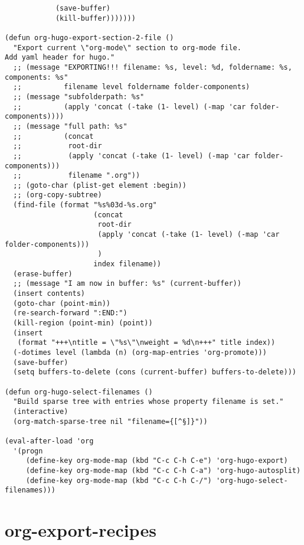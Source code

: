 \documentclass[11pt]{article}
\begin{document}
\begin{verbatim}
            (save-buffer)
            (kill-buffer)))))))

(defun org-hugo-export-section-2-file ()
  "Export current \"org-mode\" section to org-mode file.
Add yaml header for hugo."
  ;; (message "EXPORTING!!! filename: %s, level: %d, foldername: %s, components: %s"
  ;;          filename level foldername folder-components)
  ;; (message "subfolderpath: %s"
  ;;          (apply 'concat (-take (1- level) (-map 'car folder-components))))
  ;; (message "full path: %s"
  ;;          (concat
  ;;           root-dir
  ;;           (apply 'concat (-take (1- level) (-map 'car folder-components)))
  ;;           filename ".org"))
  ;; (goto-char (plist-get element :begin))
  ;; (org-copy-subtree)
  (find-file (format "%s%03d-%s.org"
                     (concat
                      root-dir
                      (apply 'concat (-take (1- level) (-map 'car folder-components)))
                      )
                     index filename))
  (erase-buffer)
  ;; (message "I am now in buffer: %s" (current-buffer))
  (insert contents)
  (goto-char (point-min))
  (re-search-forward ":END:")
  (kill-region (point-min) (point))
  (insert
   (format "+++\ntitle = \"%s\"\nweight = %d\n+++" title index))
  (-dotimes level (lambda (n) (org-map-entries 'org-promote)))
  (save-buffer)
  (setq buffers-to-delete (cons (current-buffer) buffers-to-delete)))

(defun org-hugo-select-filenames ()
  "Build sparse tree with entries whose property filename is set."
  (interactive)
  (org-match-sparse-tree nil "filename={[^§]}"))

(eval-after-load 'org
  '(progn
     (define-key org-mode-map (kbd "C-c C-h C-e") 'org-hugo-export)
     (define-key org-mode-map (kbd "C-c C-h C-a") 'org-hugo-autosplit)
     (define-key org-mode-map (kbd "C-c C-h C-/") 'org-hugo-select-filenames)))
\end{verbatim}

\section{org-export-recipes}
\label{sec:orgeb5afe3}
\end{document}
